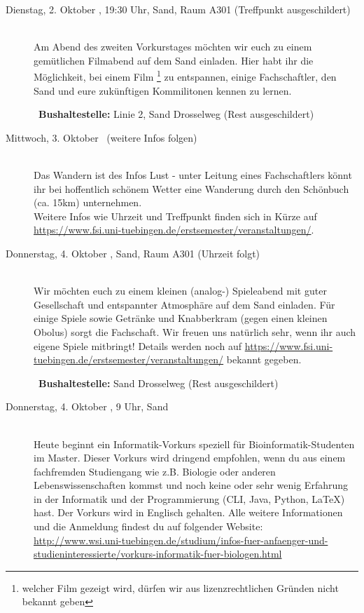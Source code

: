 \begin{description}
\item[Dienstag, 2. Oktober \Jahr, 19:30 Uhr, Sand, Raum A301 (Treffpunkt ausgeschildert)]\ \\
Am Abend des zweiten Vorkurstages möchten wir euch zu einem gemütlichen Filmabend auf dem Sand einladen.
Hier habt ihr die Möglichkeit, bei einem Film \footnote{welcher Film gezeigt wird, dürfen wir aus lizenzrechtlichen Gründen nicht bekannt geben} zu entspannen, einige Fachschaftler, den Sand und eure zukünftigen Kommilitonen kennen zu lernen.

~\textbf{Bushaltestelle:} Linie 2, Sand Drosselweg (Rest ausgeschildert) 

\item[Mittwoch, 3. Oktober \Jahr~(weitere Infos folgen)]\ \\
Das Wandern ist des Infos Lust - unter Leitung eines Fachschaftlers könnt ihr bei hoffentlich schönem Wetter eine Wanderung durch den Schönbuch (ca. 15km) unternehmen. \\
Weitere Infos wie Uhrzeit und Treffpunkt finden sich in Kürze auf \url{https://www.fsi.uni-tuebingen.de/erstsemester/veranstaltungen/}.

\item[Donnerstag, 4. Oktober \Jahr, Sand, Raum A301 (Uhrzeit folgt)]\ \\
Wir möchten euch zu einem kleinen (analog-) Spieleabend mit guter Gesellschaft und entspannter Atmosphäre auf dem Sand einladen. Für einige Spiele sowie Getränke und Knabberkram (gegen einen kleinen Obolus) sorgt die Fachschaft. Wir freuen uns natürlich sehr, wenn ihr auch eigene Spiele mitbringt! Details werden noch auf \url{https://www.fsi.uni-tuebingen.de/erstsemester/veranstaltungen/} bekannt gegeben.

~\textbf{Bushaltestelle:} Sand Drosselweg (Rest ausgeschildert) 

\ifmaster
\ifbinfo
\item[Donnerstag, 4. Oktober \Jahr, 9 Uhr, Sand]\ \\
 Heute beginnt ein Informatik-Vorkurs speziell für Bioinformatik-Studenten im Master. Dieser Vorkurs wird dringend empfohlen, wenn du aus einem fachfremden Studiengang wie z.B. Biologie oder anderen Lebenswissenschaften kommst und noch keine oder sehr wenig Erfahrung in der Informatik und der Programmierung (CLI, Java, Python, \LaTeX) hast. Der Vorkurs wird in Englisch gehalten. Alle weitere Informationen und die Anmeldung findest du auf folgender Website: \\ \url{http://www.wsi.uni-tuebingen.de/studium/infos-fuer-anfaenger-und-studieninteressierte/vorkurs-informatik-fuer-biologen.html}


\end{description}
